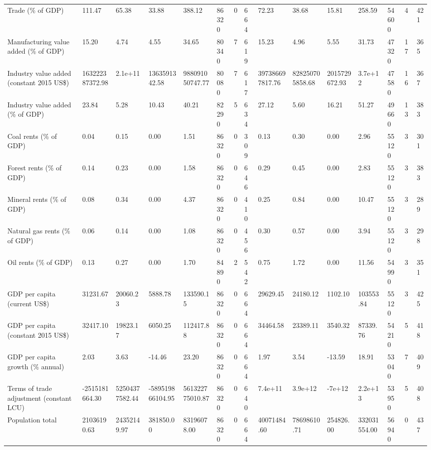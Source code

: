 \begin{longtable}{lllllllllllllll}
Trade (\% of GDP) & 111.47 & 65.38 & 33.88 & 388.12 & 86320 & 0 & 664 & 72.23 & 38.68 & 15.81 & 258.59 & 54600 & 4 & 421\\
\addlinespace
Manufacturing value added (\% of GDP) & 15.20 & 4.74 & 4.55 & 34.65 & 80340 & 7 & 619 & 15.23 & 4.96 & 5.55 & 31.73 & 47320 & 17 & 365\\
Industry value added (constant 2015 US\$) & 163222387372.98 & 2.1e+11 & 1363591342.58 & 988091050747.77 & 80080 & 7 & 617 & 397386697817.76 & 828250705858.68 & 2015729672.93 & 3.7e+12 & 47580 & 16 & 367\\
Industry value added (\% of GDP) & 23.84 & 5.28 & 10.43 & 40.21 & 82290 & 5 & 634 & 27.12 & 5.60 & 16.21 & 51.27 & 49660 & 13 & 383\\
Coal rents (\% of GDP) & 0.04 & 0.15 & 0.00 & 1.51 & 86320 & 0 & 309 & 0.13 & 0.30 & 0.00 & 2.96 & 55120 & 3 & 301\\
Forest rents (\% of GDP) & 0.14 & 0.23 & 0.00 & 1.58 & 86320 & 0 & 646 & 0.29 & 0.45 & 0.00 & 2.83 & 55120 & 3 & 383\\
\addlinespace
Mineral rents (\% of GDP) & 0.08 & 0.34 & 0.00 & 4.37 & 86320 & 0 & 410 & 0.25 & 0.84 & 0.00 & 10.47 & 55120 & 3 & 289\\
Natural gas rents (\% of GDP) & 0.06 & 0.14 & 0.00 & 1.08 & 86320 & 0 & 456 & 0.30 & 0.57 & 0.00 & 3.94 & 55120 & 3 & 298\\
Oil rents (\% of GDP) & 0.13 & 0.27 & 0.00 & 1.70 & 84890 & 2 & 542 & 0.75 & 1.72 & 0.00 & 11.56 & 54990 & 3 & 351\\
GDP per capita (current US\$) & 31231.67 & 20060.23 & 5888.78 & 133590.15 & 86320 & 0 & 664 & 29629.45 & 24180.12 & 1102.10 & 103553.84 & 55120 & 3 & 425\\
GDP per capita (constant 2015 US\$) & 32417.10 & 19823.17 & 6050.25 & 112417.88 & 86320 & 0 & 664 & 34464.58 & 23389.11 & 3540.32 & 87339.76 & 54210 & 5 & 418\\
\addlinespace
GDP per capita growth (\% annual) & 2.03 & 3.63 & -14.46 & 23.20 & 86320 & 0 & 664 & 1.97 & 3.54 & -13.59 & 18.91 & 53040 & 7 & 409\\
Terms of trade adjustment (constant LCU) & -2515181664.30 & 52504377582.44 & -589519866104.95 & 561322775010.87 & 86320 & 0 & 640 & 7.4e+11 & 3.9e+12 & -7e+12 & 2.2e+13 & 53950 & 5 & 408\\
Population total & 21036190.63 & 24352149.97 & 381850.00 & 83196078.00 & 86320 & 0 & 664 & 40071484.60 & 78698610.71 & 254826.00 & 332031554.00 & 56940 & 0 & 437\\

\end{longtable}
